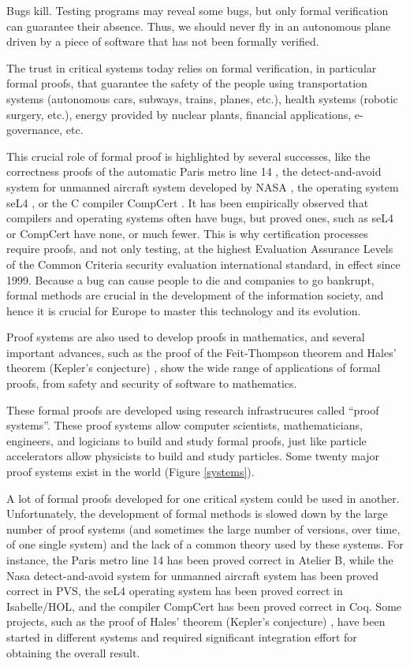 \thispagestyle{empty}

Bugs kill.  Testing programs may reveal some bugs, but only formal
verification can guarantee their absence.  Thus, we should never fly
in an autonomous plane driven by a piece of software that has not been
formally verified.

The trust in critical systems today relies on formal verification, in
particular formal proofs, that guarantee the safety of the people
using transportation systems (autonomous cars, subways, trains,
planes, etc.), health systems (robotic surgery, etc.), energy provided
by nuclear plants, financial applications, e-governance, etc.

This crucial role of formal proof is highlighted by several successes,
like the correctness proofs of the automatic Paris metro line 14
\cite{metro14}, the detect-and-avoid system for unmanned aircraft
system developed by NASA \cite{Munoz16}, the operating system seL4
\cite{Klein09}, or the C compiler CompCert \cite{Leroy06}.  It has
been empirically observed that compilers and operating systems often
have bugs, but proved ones, such as seL4 or CompCert have none, or
much fewer.  This is why certification processes require proofs, and
not only testing, at the highest Evaluation Assurance Levels of the
Common Criteria security evaluation international standard, in effect
since 1999. Because a bug can cause people to die and companies to go
bankrupt, formal methods are crucial in the development of the
information society, and hence it is crucial for Europe to master this
technology and its evolution.

Proof systems are also used to develop proofs in mathematics, and
several important advances, such as the proof of the Feit-Thompson
theorem \cite{Gonthier13} and Hales' theorem (Kepler's conjecture)
\cite{Hales17}, show the wide range of applications of formal proofs,
from safety and security of software to mathematics.

These formal proofs are developed using research infrastrucures called
``proof systems''.  These proof systems allow computer scientists,
mathematicians, engineers, and logicians to build and study formal
proofs, just like particle accelerators allow physicists to build and
study particles.  Some twenty major proof systems exist in the world
(Figure \ref{systems}).

A lot of formal proofs developed for one critical system could be used
in another.  Unfortunately, the development of formal methods is
slowed down by the large number of proof systems (and sometimes the
large number of versions, over time, of one single system) and the
lack of a common theory used by these systems.  For instance, the
Paris metro line 14 has been proved correct in Atelier B, while the
Nasa detect-and-avoid system for unmanned aircraft system has been
proved correct in PVS, the seL4 operating system has been proved
correct in Isabelle/HOL, and the compiler CompCert has been proved
correct in Coq.  Some projects, such as the proof of Hales' theorem
(Kepler's conjecture) \cite{Hales17}, have been started in different
systems and required significant integration effort for obtaining the
overall result.

